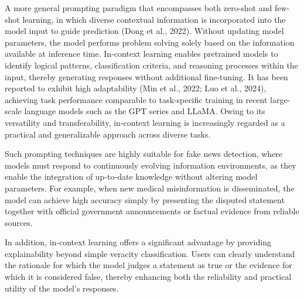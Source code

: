 \documentclass[a4paper,fleqn]{cas-sc}
\begin{document}
\begin{itemize}
{    A more general prompting paradigm that encompasses both zero-shot and few-shot learning, in which diverse contextual information is incorporated into the model input to guide prediction (Dong et al., 2022). Without updating model parameters, the model performs problem solving solely based on the information available at inference time. In-context learning enables pretrained models to identify logical patterns, classification criteria, and reasoning processes within the input, thereby generating responses without additional fine-tuning. It has been reported to exhibit high adaptability (Min et al., 2022; Luo et al., 2024), achieving task performance comparable to task-specific training in recent large-scale language models such as the GPT series and LLaMA. Owing to its versatility and transferability, in-context learning is increasingly regarded as a practical and generalizable approach across diverse tasks.}
\end{itemize}

Such prompting techniques are highly suitable for fake news detection, where models must respond to continuously evolving information environments, as they enable the integration of up-to-date knowledge without altering model parameters. For example, when new medical misinformation is disseminated, the model can achieve high accuracy simply by presenting the disputed statement together with official government announcements or factual evidence from reliable sources.

In addition, in-context learning offers a significant advantage by providing explainability beyond simple veracity classification. Users can clearly understand the rationale for which the model judges a statement as true or the evidence for which it is considered false, thereby enhancing both the reliability and practical utility of the model's responses.
\end{document}
